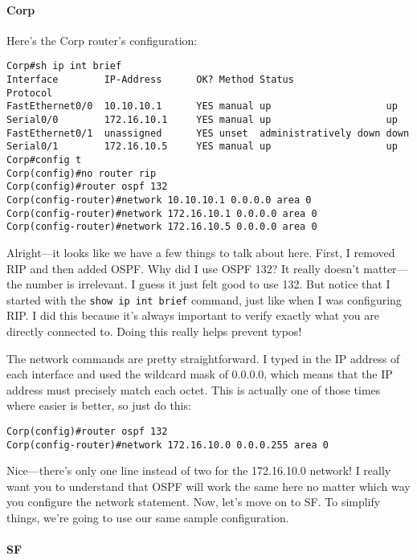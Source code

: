 \paragraph{Corp}

Here's the Corp router's configuration:

\begin{verbatim}
Corp#sh ip int brief
Interface        IP-Address      OK? Method Status                Protocol
FastEthernet0/0  10.10.10.1      YES manual up                    up
Serial0/0        172.16.10.1     YES manual up                    up
FastEthernet0/1  unassigned      YES unset  administratively down down
Serial0/1        172.16.10.5     YES manual up                    up
Corp#config t
Corp(config)#no router rip
Corp(config)#router ospf 132
Corp(config-router)#network 10.10.10.1 0.0.0.0 area 0
Corp(config-router)#network 172.16.10.1 0.0.0.0 area 0
Corp(config-router)#network 172.16.10.5 0.0.0.0 area 0
\end{verbatim}

Alright---it looks like we have a few things to talk about here. First,
I removed RIP and then added OSPF. Why did I use OSPF 132? It really
doesn't matter---the number is irrelevant. I guess it just felt good to
use 132. But notice that I started with the
\texttt{show\ ip\ int\ brief} command, just like when I was configuring
RIP. I did this because it's always
\protect\hypertarget{c18.xhtmlux5cux23Page_759}{}{}important to verify
exactly what you are directly connected to. Doing this really helps
prevent typos!

The network commands are pretty straightforward. I typed in the IP
address of each interface and used the wildcard mask of 0.0.0.0, which
means that the IP address must precisely match each octet. This is
actually one of those times where easier is better, so just do this:

\begin{verbatim}
Corp(config)#router ospf 132
Corp(config-router)#network 172.16.10.0 0.0.0.255 area 0
\end{verbatim}

Nice---there's only one line instead of two for the 172.16.10.0 network!
I really want you to understand that OSPF will work the same here no
matter which way you configure the network statement. Now, let's move on
to SF. To simplify things, we're going to use our same sample
configuration.

\paragraph{SF}

